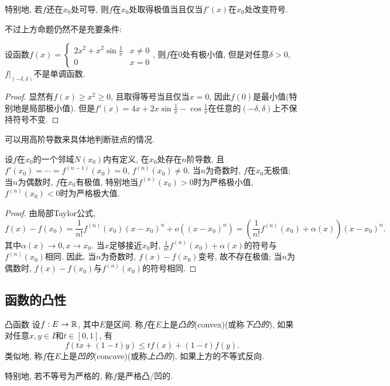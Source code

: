 特别地, 若$f$还在$x_0$处可导, 则$f$在$x_0$处取得极值当且仅当$f'(x)$在$x_0$处改变符号. 

不过上方命题仍然不是充要条件: 

\begin{example}
	设函数$f(x) = \begin{cases}
		2x^2+x^2\sin \frac{1}{x} & x \neq 0 \\ 0 & x=0
	\end{cases}$, 则$f$在$0$处有极小值, 但是对任意$\delta >0$, $f|_{(-\delta,\delta)}$不是单调函数. 
\end{example}
\begin{proof}
	显然有$f(x) \geq x^2 \geq 0$, 且取得等号当且仅当$x=0$, 因此$f(0)$是最小值(特别地是局部极小值). 但是$f'(x) = 4x+2x\sin \frac{1}{x}-\cos \frac{1}{x}$在任意的$(-\delta,\delta)$上不保持符号不变. 
\end{proof}

可以用高阶导数来具体地判断驻点的情况. 

\begin{proposition}{}
	设$f$在$x_0$的一个邻域$N(x_0)$内有定义, 在$x_0$处存在$n$阶导数, 且$f'(x_0) = \cdots = f^{(n-1)}(x_0) = 0$, $f^{(n)}(x_0) \neq 0$. 当$n$为奇数时, $f$在$x_0$无极值; 当$n$为偶数时, $f$在$x_0$有极值, 特别地当$f^{(n)}(x_0)>0$时为严格极小值, $f^{(n)}(x_0)<0$时为严格极大值. 
\end{proposition}
\begin{proof}
	由局部Taylor公式, $$f(x)-f(x_0) = \frac{1}{n!} f^{(n)}(x_0)(x-x_0)^n+o((x-x_0)^n) = \left( \frac{1}{n!} f^{(n)}(x_0) + \alpha (x) \right)(x-x_0)^n. $$
	其中$\alpha (x) \to 0,x \to x_0$. 当$x$足够接近$x_0$时, $\frac{1}{n!} f^{(n)}(x_0) + \alpha (x)$的符号与$f^{(n)}(x_0)$相同. 因此, 当$n$为奇数时, $f(x)-f(x_0)$变号, 故不存在极值; 当$n$为偶数时, $f(x)-f(x_0)$与$f^{(n)}(x_0)$的符号相同. 
\end{proof}

\subsection{函数的凸性}

\begin{definition}{凸函数}
	设$f:E \to \mathbb{R}$, 其中$E$是区间. 称$f$在$E$上是\textit{凸的}(convex)(或称\textit{下凸的}), 如果对任意$x,y \in I$和$t \in [0,1]$, 有$$f(tx+(1-t)y) \leq tf(x)+(1-t)f(y). $$
	类似地, 称$f$在$E$上是\textit{凹的}(concave)(或称\textit{上凸的}), 如果上方的不等式反向. 
\end{definition}
\begin{remark}
	特别地, 若不等号为严格的, 称$f$是严格凸/凹的. 
\end{remark}

